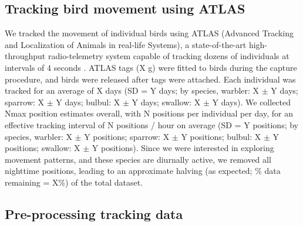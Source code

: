 \subsection*{Tracking bird movement using ATLAS}

We tracked the movement of individual birds using ATLAS (Advanced Tracking and Localization of Animals in real-life Systems), a state-of-the-art high-throughput radio-telemetry system capable of tracking dozens of individuals at intervals of 4 seconds \citep{weiser2016,toledo2014,toledo2020}.
ATLAS tags ({\color{red}X g}) were fitted to birds during the capture procedure, and birds were released after tags were attached.
Each individual was tracked for an average of X days (SD = Y days; by species, warbler: X $\pm$ Y days; sparrow: X $\pm$ Y days; bulbul: X $\pm$ Y days; swallow: X $\pm$ Y days).
We collected Nmax position estimates overall, with N positions per individual per day, for an effective tracking interval of N positions / hour on average (SD = Y positions; by species, warbler: X $\pm$ Y positions; sparrow: X $\pm$ Y positions; bulbul: X $\pm$ Y positions; swallow: X $\pm$ Y positions).
Since we were interested in exploring movement patterns, and these species are diurnally active, we removed all nighttime positions, leading to an approximate halving (as expected; \% data remaining = X\%) of the total dataset.

\subsection*{Pre-processing tracking data}

